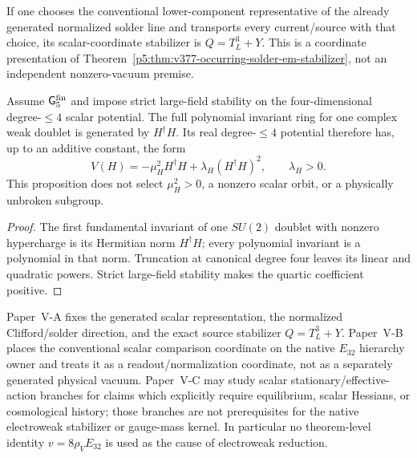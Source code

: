 \documentclass[12pt,a4paper]{article}
\begin{document}
\begin{corollary}
\label{p5:prop:part1-em-stabilizer}
\label{p5:thm:part1-em-stabilizer}%
If one chooses the conventional lower-component representative of the already
generated normalized solder line and transports every current/source with
that choice, its scalar-coordinate stabilizer is
\(Q=T_L^3+Y\).  This is a coordinate presentation of
Theorem~\ref{p5:thm:v377-occurring-solder-em-stabilizer}, not an independent
nonzero-vacuum premise.
\end{corollary}

\begin{proposition}
\label{p5:cor:finite-core-ewsb-topology}
Assume
\(\mathsf G_5^{\rm fin}\) and impose strict
large-field stability on the four-dimensional degree-\(\le4\) scalar
potential.  The full polynomial invariant ring for one complex weak doublet
is generated by \(H^\dagger H\).  Its real degree-\(\le4\) potential
therefore has, up to an additive constant, the form
\begin{equation}
\label{p5:eq:finite-core-scalar-potential}
V(H)=-\mu_H^2 H^\dagger H+\lambda_H(H^\dagger H)^2,
\qquad \lambda_H>0.
\end{equation}
This proposition does not select \(\mu_H^2>0\), a nonzero scalar orbit, or a
physically unbroken subgroup.
\end{proposition}

\begin{proof}
The first fundamental invariant of one \(SU(2)\) doublet with nonzero
hypercharge is its Hermitian norm \(H^\dagger H\); every polynomial invariant
is a polynomial in that norm.  Truncation at canonical degree four leaves its
linear and quadratic powers.  Strict large-field stability makes the
quartic coefficient positive.
\end{proof}

\begin{remark}
\label{p5:rem:finite-core-ewsb-handoff}
Paper~V-A fixes the generated scalar representation, the normalized
Clifford/solder direction, and the exact source stabilizer
\(Q=T_L^3+Y\).  Paper~V-B places the conventional scalar comparison coordinate
on the native \(E_{32}\) hierarchy owner and treats it as a
readout/normalization coordinate, not as a separately generated physical
vacuum.  Paper~V-C may study scalar stationary/effective-action branches for
claims which explicitly require equilibrium, scalar Hessians, or cosmological
history; those branches are not prerequisites for the native electroweak
stabilizer or gauge-mass kernel.  In particular no theorem-level identity
\(v=8\rho_VE_{32}\) is used as the cause of electroweak reduction.
\end{remark}
\end{document}
